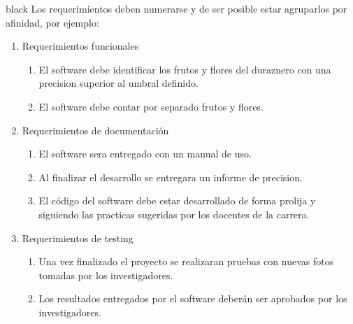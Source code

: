 \documentclass[
11pt, %
]{charter}
\begin{document}
\begin{consigna}{black}
Los requerimientos deben numerarse y de ser posible estar agruparlos por afinidad, por ejemplo:

\begin{enumerate}
	\item Requerimientos funcionales
		\begin{enumerate}
			\item El software debe identificar los frutos y flores del duraznero con una precision superior al umbral definido.
			\item El software debe contar por separado frutos y flores.
		\end{enumerate}
	\item Requerimientos de documentación
		\begin{enumerate}
			\item El software sera entregado con un manual de uso.
			\item Al finalizar el desarrollo se entregara un informe de precision.
			\item El código del software debe estar desarrollado de forma prolija y siguiendo las practicas sugeridas por los docentes de la carrera.
			
		\end{enumerate}
	\item Requerimientos de testing
		\begin{enumerate}
			\item Una vez finalizado el proyecto se realizaran pruebas con nuevas fotos tomadas por los investigadores.
			\item Los resultados entregados por el software deberán ser aprobados por los investigadores.
		\end{enumerate}
		
\end{enumerate}

\end{consigna}
\end{document}
